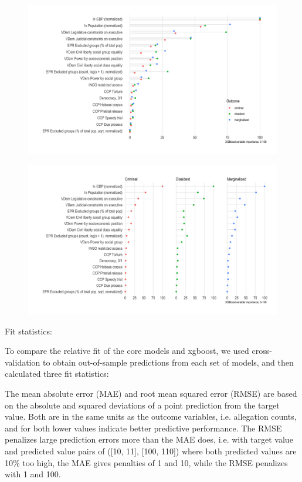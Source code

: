 \documentclass[12pt]{article}
\begin{document}
\begin{figure}
\includegraphics[width=.9\textwidth]{../output/figures/xgboost-variable-importance-v1.png}
\end{figure}

\begin{figure}
\includegraphics[width=.9\textwidth]{../output/figures/xgboost-variable-importance-v2.png}
\end{figure}

Fit statistics:

To compare the relative fit of the core models and xgboost, we used cross-validation to obtain out-of-sample predictions from each set of models, and then calculated three fit statistics:

The mean absolute error (MAE) and root mean squared error (RMSE) are based on the absolute and squared deviations of a point prediction from the target value. Both are in the same units as the outcome variables, i.e. allegation counts, and for both lower values indicate better predictive performance. The RMSE penalizes large prediction errors more than the MAE does, i.e. with target value and predicted value pairs of ([10, 11], [100, 110]) where both predicted values are 10\% too high, the MAE gives penalties of 1 and 10, while the RMSE penalizes with 1 and 100. 
\end{document}
